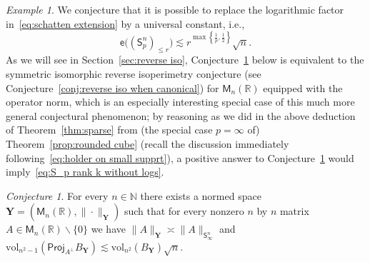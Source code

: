 \documentclass[11pt,reqno]{amsart}
\renewcommand{\le}{\leqslant}
\renewcommand{\setminus}{\smallsetminus}
\newcommand{\proj}{\mathsf{Proj}}
\newcommand{\Y}{\mathbf Y}
\newcommand{\R}{\mathbb R}
\theoremstyle{remark}
\newtheorem{example}[theorem]{Example}
\newtheorem{conjecture}[theorem]{Conjecture}
\newcommand{\M}{\mathsf{M}}
\newcommand{\sfS}{\mathsf{S}}
\newcommand{\N}{\mathbb N}
\newcommand{\ee}{\mathsf{e}}
\newcommand{\vol}{\mathrm{vol}}
\renewcommand{\1}{\mathbf 1}
\begin{document}
\begin{example}
We conjecture that it is possible to replace the logarithmic factor in~\eqref{eq:schatten extension} by a universal constant, i.e.,
\begin{equation}\label{eq:S_p rank k without logs}
\ee\big((\sfS_p^{n})_{\le r}\big)\lesssim r^{\max\left\{\frac{1}{p},\frac12\right\}}\sqrt{n}.
\end{equation}
As we will see in Section~\ref{sec:reverse iso}, Conjecture~\ref{conj:S infty reverse iso} below is equivalent to the symmetric  isomorphic reverse isoperimetry conjecture (see Conjecture~\ref{conj:reverse iso when canonical})  for $\M_n(\R)$ equipped with the operator norm, which is an especially interesting special case of this much more general conjectural phenomenon; by reasoning as we did in the above deduction of Theorem~\ref{thm:sparse} from (the special case $p=\infty$ of) Theorem~\ref{prop:rounded cube} (recall the discussion immediately following~\eqref{eq:holder on small supprt}), a positive answer to Conjecture~\ref{conj:S infty reverse iso} would imply~\eqref{eq:S_p rank k without logs}.
\begin{conjecture}\label{conj:S infty reverse iso} For every  $n\in \N$ there exists a normed space $\Y=(\M_n(\R),\|\cdot\|_\Y)$ such that for every nonzero $n$ by $n$ matrix $A\in \M_n(\R)\setminus\{0\}$ we have  $\|A\|_\Y\asymp \|A\|_{\sfS_\infty^n}$ and $\vol_{n^2-1}(\proj_{A^\perp}B_{\Y})\lesssim \vol_{n^2}(B_{\Y})\sqrt{n}$.
\end{conjecture}
\end{example}
\end{document}
